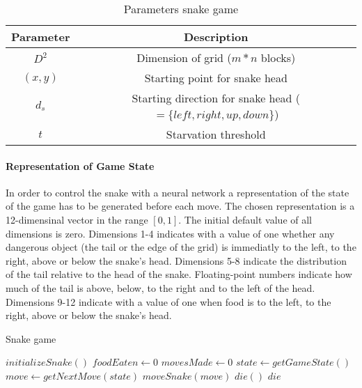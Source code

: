 \begin{table}[H]
  \centering
  \begin{center}
    \begin{tabular}{ | c | c | }
      \hline
      Parameter & Description \\ \hline
      $D^2$ & Dimension of grid ($m*n$ blocks) \\ \hline
      $(x,y)$ & Starting point for snake head \\ \hline
      $d_s$ & Starting direction for snake head ($=\{left,right,up,down\}$) \\ \hline
      $t$ & Starvation threshold \\ \hline
    \end{tabular}
  \end{center}
  \caption{Parameters snake game}
  \label{snake_p}
\end{table}


\paragraph{Representation of Game State}

In order to control the snake with a neural network a representation of the state of the game has to be generated before each move. The chosen representation is a 12-dimensinal vector in the range $[0,1]$. The initial default value of all dimensions is zero. Dimensions 1-4 indicates with a value of one whether any dangerous object (the tail or the edge of the grid) is immediatly to the left, to the right, above or below the snake's head. Dimensions 5-8 indicate the distribution of the tail relative to the head of the snake. Floating-point numbers indicate how much of the tail is above, below, to the right and to the left of the head. Dimensions 9-12 indicate with a value of one when food is to the left, to the right, above or below the snake's head.

\begin{algorithm}[h]

  \caption{Snake game}
  \label{snake_alg}
    \begin{algorithmic}
      \State $initializeSnake()$
      \State $foodEaten \gets 0$
      \State $movesMade \gets 0$
        \State $state \gets getGameState()$
        \State $move \gets getNextMove(state)$
        \State $moveSnake(move)$
         $die()$
        \EndIf
         $die$
        \EndIf
        \EndIf
      \EndWhile

    \end{algorithmic}
\end{algorithm}

